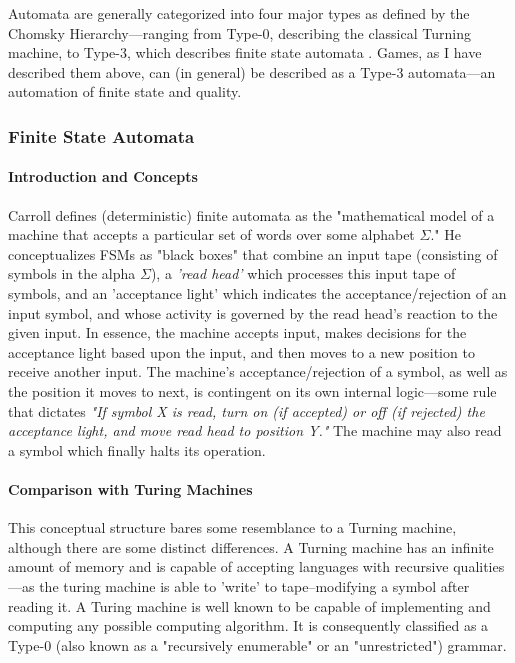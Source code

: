 \documentclass{report}
\begin{document}
Automata are generally categorized into four major types as defined by the Chomsky Hierarchy---ranging from Type-0, describing the classical Turning machine, to Type-3, which describes finite state automata \cite{Chomsky1956ThreeMF}. Games, as I have described them above, can (in general) be described as a Type-3 automata---an automation of finite state and quality. 

\subsubsection{Finite State Automata}

\paragraph{Introduction and Concepts}

Carroll defines (deterministic) finite automata as the "mathematical model of a machine that accepts a particular set of words over some alphabet $\Sigma$.\cite{FSM}" He conceptualizes FSMs as "black boxes" that combine an input tape (consisting of symbols in the alpha $\Sigma$), a \emph{'read head'} which processes this input tape of symbols, and an 'acceptance light' which indicates the acceptance/rejection of an input symbol, and whose activity is governed by the read head's reaction to the given input. In essence, the machine accepts input, makes decisions for the acceptance light based upon the input, and then moves to a new position to receive another input. The machine's acceptance/rejection of a symbol, as well as the position it moves to next, is contingent on its own internal logic---some rule that dictates \emph{"If symbol X is read, turn on (if accepted) or off (if rejected) the acceptance light, and move read head to position Y."} The machine may also read a symbol which finally halts its operation.

\paragraph{Comparison with Turing Machines}

This conceptual structure bares some resemblance to a Turning machine\cite{Turing}, although there are some distinct differences. A Turning machine has an infinite amount of memory and is capable of accepting languages with recursive qualities---as the turing machine is able to 'write' to tape--modifying a symbol after reading it. A Turing machine is well known to be capable of implementing and computing any possible computing algorithm\cite{Turing_2004}. It is consequently classified as a Type-0 (also known as a "recursively enumerable" or an "unrestricted") grammar.
\end{document}
